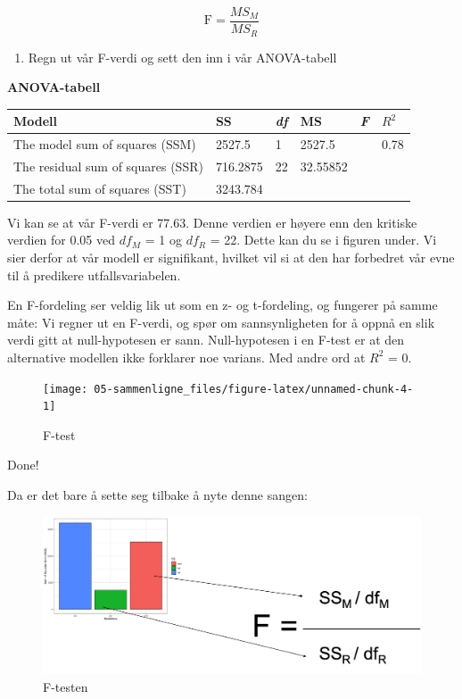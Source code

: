 \documentclass[
]{book}
\providecommand{\tightlist}{%
  \setlength{\itemsep}{0pt}\setlength{\parskip}{0pt}}
\begin{document}
\[
\text{F}  = \frac{MS_M}{MS_R}
\]

\begin{enumerate}
\def\labelenumi{\alph{enumi}.}
\setcounter{enumi}{2}
\tightlist
\item
  Regn ut vår F-verdi og sett den inn i vår ANOVA-tabell
\end{enumerate}

\textbf{ANOVA-tabell}

\begin{longtable}[]{@{}llllll@{}}
\toprule
Modell & SS & \emph{df} & MS & \emph{F} & \(R^2\)\tabularnewline
\midrule
\endhead
The model sum of squares (SSM) & 2527.5 & 1 & 2527.5 & & 0.78\tabularnewline
The residual sum of squares (SSR) & 716.2875 & 22 & 32.55852 & &\tabularnewline
The total sum of squares (SST) & 3243.784 & & & &\tabularnewline
\bottomrule
\end{longtable}

Vi kan se at vår F-verdi er 77.63. Denne verdien er høyere enn den kritiske verdien for 0.05 ved \(df_M\) = 1 og \(df_R\) = 22. Dette kan du se i figuren under. Vi sier derfor at vår modell er signifikant, hvilket vil si at den har forbedret vår evne til å predikere utfallsvariabelen.

En F-fordeling ser veldig lik ut som en z- og t-fordeling, og fungerer på samme måte: Vi regner ut en F-verdi, og spør om sannsynligheten for å oppnå en slik verdi gitt at null-hypotesen er sann. Null-hypotesen i en F-test er at den alternative modellen ikke forklarer noe varians. Med andre ord at \(R^2\) = 0.

\begin{figure}

{\centering \texttt{[image: 05-sammenligne\_files/figure-latex/unnamed-chunk-4-1]} 

}

\caption{F-test}\label{fig:unnamed-chunk-4}
\end{figure}

{Done!}

Da er det bare å sette seg tilbake å nyte denne sangen:

\begin{figure}
\centering
\includegraphics{F.png}
\caption{F-testen}
\end{figure}
\end{document}

